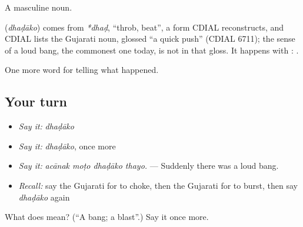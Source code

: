 A masculine noun.

\begin{cousinweb}
\textbf{} (\emph{dhaḍāko}) comes from \emph{*dhaḍ}, \textquotedblleft{}throb, beat\textquotedblright{}, a form CDIAL reconstructs, and CDIAL lists the Gujarati noun, glossed \textquotedblleft{}a quick push\textquotedblright{} (CDIAL 6711); the sense of a loud bang, the commonest one today, is not in that gloss. It happens with \textbf{}: \textbf{ }.
\end{cousinweb}

\begin{grammarlens}[title={What you've built}]
One more word for telling what happened.
\end{grammarlens}

\subsection*{Your turn}
\begin{itemize}
\raggedright
  \item \emph{Say it:} \emph{dhaḍāko}
  \item \emph{Say it:} \emph{dhaḍāko}, once more
  \item \emph{Say it:} \emph{acānak moṭo dhaḍāko thayo.} — Suddenly there was a loud bang.
  \item \emph{Recall:} say the Gujarati for to choke, then the Gujarati for to burst, then say \emph{dhaḍāko} again
\end{itemize}

\begin{tcolorbox}[breakable,colback=teal!4,colframe=teal!35!black,title={Before you move on}]
What does  mean? (\textquotedblleft{}A bang; a blast\textquotedblright{}.) Say it once more.
\end{tcolorbox}
